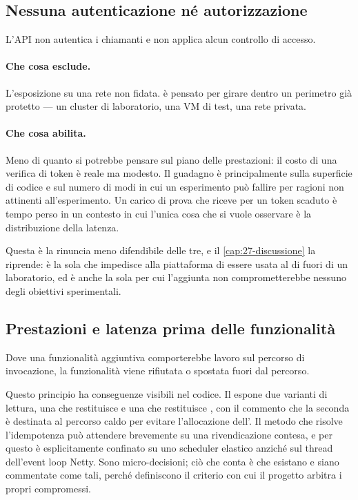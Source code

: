 \subsection{Nessuna autenticazione n\'e autorizzazione}

L'API non autentica i chiamanti e non applica alcun controllo di accesso.

\paragraph{Che cosa esclude.} L'esposizione su una rete non fidata. \nf{} \`e
pensato per girare dentro un perimetro gi\`a protetto --- un cluster di
laboratorio, una VM di test, una rete privata.

\paragraph{Che cosa abilita.} Meno di quanto si potrebbe pensare sul piano delle
prestazioni: il costo di una verifica di token \`e reale ma modesto. Il guadagno
\`e principalmente sulla superficie di codice e sul numero di modi in cui un
esperimento pu\`o fallire per ragioni non attinenti all'esperimento. Un carico di
prova che riceve  per un token scaduto \`e tempo perso in un contesto
in cui l'unica cosa che si vuole osservare \`e la distribuzione della latenza.

Questa \`e la rinuncia meno difendibile delle tre, e il \cref{cap:27-discussione}
la riprende: \`e la sola che impedisce alla piattaforma di essere usata al di
fuori di un laboratorio, ed \`e anche la sola per cui l'aggiunta non
comprometterebbe nessuno degli obiettivi sperimentali.

\subsection{Prestazioni e latenza prima delle funzionalit\`a}

Dove una funzionalit\`a aggiuntiva comporterebbe lavoro sul percorso di
invocazione, la funzionalit\`a viene rifiutata o spostata fuori dal percorso.

Questo principio ha conseguenze visibili nel codice. Il 
espone due varianti di lettura, una che restituisce  e una che
restituisce , con il commento che la seconda \`e destinata al percorso
caldo per evitare l'allocazione dell'. Il metodo che risolve
l'idempotenza pu\`o attendere brevemente su una rivendicazione contesa, e per
questo \`e esplicitamente confinato su uno scheduler elastico anzich\'e sul
thread dell'event loop Netty. Sono micro-decisioni; ci\`o che conta \`e che
esistano e siano commentate come tali, perch\'e definiscono il criterio con cui
il progetto arbitra i propri compromessi.


